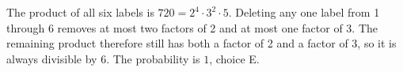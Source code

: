 The product of all six labels is $720=2^4\cdot3^2\cdot5$. Deleting any one label from 1 through 6 removes at most two factors of 2 and at most one factor of 3. The remaining product therefore still has both a factor of 2 and a factor of 3, so it is always divisible by 6. The probability is $\boxed1$, choice E.
